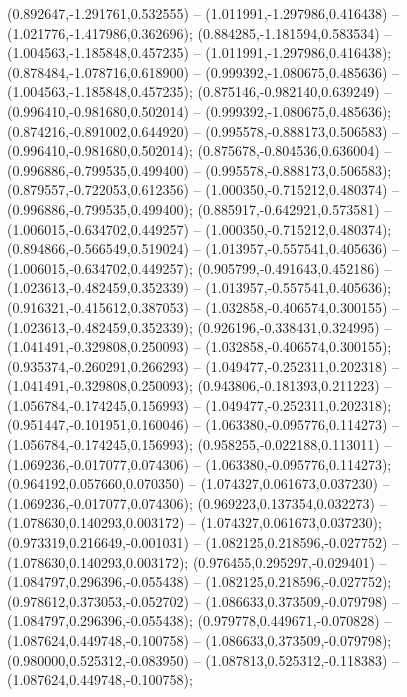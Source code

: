  (0.892647,-1.291761,0.532555) -- (1.011991,-1.297986,0.416438) -- (1.021776,-1.417986,0.362696);
 (0.884285,-1.181594,0.583534) -- (1.004563,-1.185848,0.457235) -- (1.011991,-1.297986,0.416438);
 (0.878484,-1.078716,0.618900) -- (0.999392,-1.080675,0.485636) -- (1.004563,-1.185848,0.457235);
 (0.875146,-0.982140,0.639249) -- (0.996410,-0.981680,0.502014) -- (0.999392,-1.080675,0.485636);
 (0.874216,-0.891002,0.644920) -- (0.995578,-0.888173,0.506583) -- (0.996410,-0.981680,0.502014);
 (0.875678,-0.804536,0.636004) -- (0.996886,-0.799535,0.499400) -- (0.995578,-0.888173,0.506583);
 (0.879557,-0.722053,0.612356) -- (1.000350,-0.715212,0.480374) -- (0.996886,-0.799535,0.499400);
 (0.885917,-0.642921,0.573581) -- (1.006015,-0.634702,0.449257) -- (1.000350,-0.715212,0.480374);
 (0.894866,-0.566549,0.519024) -- (1.013957,-0.557541,0.405636) -- (1.006015,-0.634702,0.449257);
 (0.905799,-0.491643,0.452186) -- (1.023613,-0.482459,0.352339) -- (1.013957,-0.557541,0.405636);
 (0.916321,-0.415612,0.387053) -- (1.032858,-0.406574,0.300155) -- (1.023613,-0.482459,0.352339);
 (0.926196,-0.338431,0.324995) -- (1.041491,-0.329808,0.250093) -- (1.032858,-0.406574,0.300155);
 (0.935374,-0.260291,0.266293) -- (1.049477,-0.252311,0.202318) -- (1.041491,-0.329808,0.250093);
 (0.943806,-0.181393,0.211223) -- (1.056784,-0.174245,0.156993) -- (1.049477,-0.252311,0.202318);
 (0.951447,-0.101951,0.160046) -- (1.063380,-0.095776,0.114273) -- (1.056784,-0.174245,0.156993);
 (0.958255,-0.022188,0.113011) -- (1.069236,-0.017077,0.074306) -- (1.063380,-0.095776,0.114273);
 (0.964192,0.057660,0.070350) -- (1.074327,0.061673,0.037230) -- (1.069236,-0.017077,0.074306);
 (0.969223,0.137354,0.032273) -- (1.078630,0.140293,0.003172) -- (1.074327,0.061673,0.037230);
 (0.973319,0.216649,-0.001031) -- (1.082125,0.218596,-0.027752) -- (1.078630,0.140293,0.003172);
 (0.976455,0.295297,-0.029401) -- (1.084797,0.296396,-0.055438) -- (1.082125,0.218596,-0.027752);
 (0.978612,0.373053,-0.052702) -- (1.086633,0.373509,-0.079798) -- (1.084797,0.296396,-0.055438);
 (0.979778,0.449671,-0.070828) -- (1.087624,0.449748,-0.100758) -- (1.086633,0.373509,-0.079798);
 (0.980000,0.525312,-0.083950) -- (1.087813,0.525312,-0.118383) -- (1.087624,0.449748,-0.100758);
